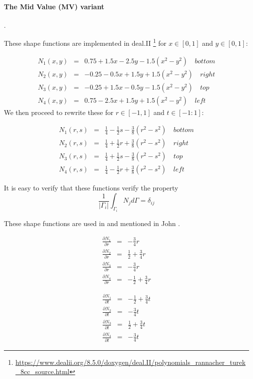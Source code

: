 \paragraph{The Mid Value (MV) variant}. 

These shape functions are implemented in deal.II
\footnote{\url{https://www.dealii.org/8.5.0/doxygen/deal.II/polynomials_rannacher_turek_8cc_source.html}}
for $x\in[0,1]$ and $y\in[0,1]$:

\begin{eqnarray}
N_1(x,y) &=&  0.75 + 1.5x - 2.5y -1.5(x^2-y^2) \quad bottom\\
N_2(x,y) &=& -0.25 - 0.5x + 1.5y +1.5(x^2-y^2) \quad right\\
N_3(x,y) &=& -0.25 + 1.5x - 0.5y -1.5(x^2-y^2) \quad top\\
N_4(x,y) &=&  0.75 - 2.5x + 1.5y +1.5(x^2-y^2) \quad left
\end{eqnarray}
We then proceed to rewrite these for $r\in[-1,1]$ and $t\in[-1:1]$:
\begin{mdframed}[backgroundcolor=blue!5]
\begin{eqnarray}
N_1(r,s) &=& \frac{1}{4} -\frac{1}{2}s - \frac{3}{8}(r^2-s^2) \quad bottom \\
N_2(r,s) &=& \frac{1}{4} +\frac{1}{2}r + \frac{3}{8}(r^2-s^2) \quad right \\
N_3(r,s) &=& \frac{1}{4} +\frac{1}{2}s - \frac{3}{8}(r^2-s^2) \quad top \\
N_4(r,s) &=& \frac{1}{4} -\frac{1}{2}r + \frac{3}{8}(r^2-s^2) \quad left
\end{eqnarray}
\end{mdframed}
It is easy to verify that these functions verify the property
\[
\frac{1}{|\Gamma_i|} \int_{\Gamma_i} N_j d\Gamma = \delta_{ij}
\]

These shape functions are used in \cite{shzh06} and mentioned in John \cite[p.722]{john16}.

\begin{eqnarray}
\frac{\partial N_1}{\partial r} &=& -\frac{3}{4}r \nonumber\\
\frac{\partial N_2}{\partial r} &=& \frac{1}{2}+\frac{3}{4}r \nonumber\\
\frac{\partial N_3}{\partial r} &=& -\frac{3}{4}r \nonumber\\
\frac{\partial N_4}{\partial r} &=& -\frac{1}{2}+\frac{3}{4}r \nonumber
\end{eqnarray}

\begin{eqnarray}
\frac{\partial N_1}{\partial t} &=& -\frac{1}{2}+\frac{3}{4}t \nonumber\\
\frac{\partial N_2}{\partial t} &=& -\frac{3}{4}t \nonumber\\
\frac{\partial N_3}{\partial t} &=& \frac{1}{2}+\frac{3}{4}t \nonumber\\
\frac{\partial N_4}{\partial t} &=& -\frac{3}{4}t \nonumber
\end{eqnarray}













